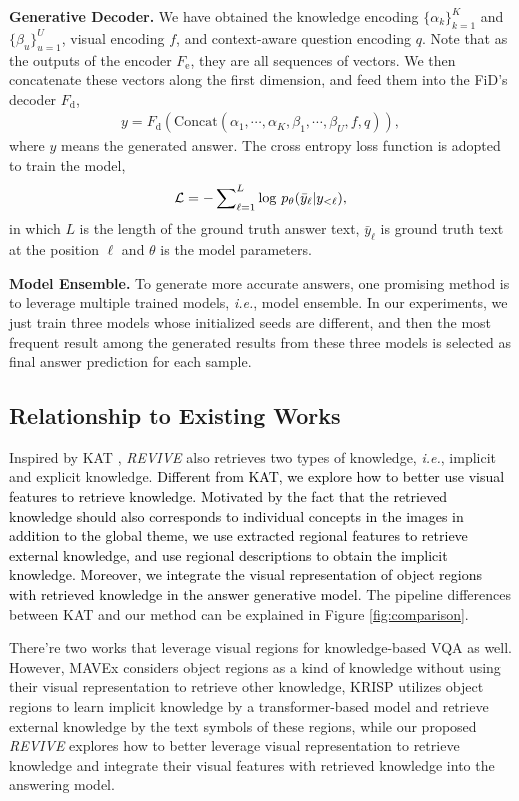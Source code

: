 \documentclass{article}
\begin{document}
\textbf{Generative Decoder. } We have obtained the knowledge encoding $\{\alpha_{k}\}_{k=1}^{K}$ and $\{\beta_u\}_{u=1}^U$, visual encoding $f$, and context-aware question encoding $q$. Note that as the outputs of the encoder $F_{\text{e}}$, they are all sequences of vectors. We then concatenate these vectors along the first dimension, and feed them into the FiD's decoder $F_{\text{d}}$,
\begin{gather}
y = F_{\text{d}}(\text{Concat}(\alpha_{1},\cdots, \alpha_K,  \beta_1, \cdots, \beta_U, f, q)), 
\end{gather}
where $y$ means the generated answer. The cross entropy loss function is adopted to train the model,
	\begin{gather}
	\label{encode}
        \mathcal{L} = -\sum\nolimits_{\ell=1}^{L} {\rm log} \ p_{\theta}(\bar{y}_{\ell}|y_{<\ell}),
    \end{gather}
in which $L$ is the length of the ground truth answer text, $\bar{y}_{\ell}$ is ground truth text at the position $\ell$ and $\theta$ is the model parameters.

\textbf{Model Ensemble. } To generate more accurate answers, one promising method is to leverage multiple trained models, \textit{i.e.}, model ensemble. In our experiments, we just train three models whose initialized seeds are different, and then the most frequent result among the generated results from these three models is selected as final answer prediction for each sample.

\subsection{Relationship to Existing Works}
Inspired by KAT \cite{gui2021kat}, \textit{REVIVE} also retrieves two types of knowledge, \textit{i.e.}, implicit and explicit knowledge. \textcolor{black}{Different from KAT, we explore how to better use visual features to retrieve knowledge. Motivated by the fact that the retrieved knowledge should also corresponds to individual concepts in the images in addition to the global theme, we use extracted regional features to retrieve external knowledge, and use regional descriptions to obtain the implicit knowledge. Moreover, we integrate the visual representation of object regions with retrieved knowledge in the answer generative model}. The pipeline differences between KAT \cite{gui2021kat} and our method can be explained in Figure \ref{fig:comparison}.

There're two works \cite{wu2021multi, marino2021krisp} that leverage visual regions for knowledge-based VQA as well. However, MAVEx \cite{wu2021multi} considers object regions as a kind of knowledge without using their visual representation to retrieve other knowledge, KRISP \cite{marino2021krisp} utilizes object regions to learn implicit knowledge by a transformer-based model and retrieve external knowledge by the text symbols of these regions, while our proposed \textit{REVIVE} explores how to better leverage visual representation to retrieve knowledge and integrate their visual features with retrieved knowledge into the answering model.
\end{document}
